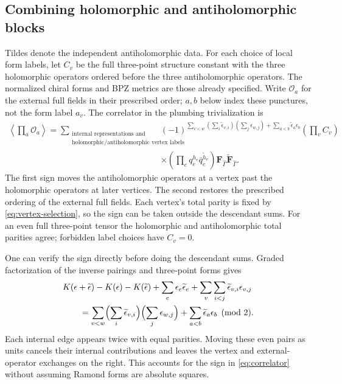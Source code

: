 \documentclass[11pt]{article}
\numberwithin{equation}{section}
\begin{document}
\subsection{Combining holomorphic and antiholomorphic blocks}

Tildes denote the independent antiholomorphic data. For each choice of
local form labels, let $C_v$ be the full three-point structure constant
with the three holomorphic operators ordered before the three
antiholomorphic operators. The normalized chiral forms and BPZ metrics
are those already specified. Write $\mathcal O_a$ for the external full
fields in their prescribed order; $a,b$ below index these punctures,
not the form label $a_v$. The correlator in the plumbing
trivialization is
\begin{align}
 \left\langle\prod_a\mathcal O_a\right\rangle
 =\sum_{\substack{\text{internal representations and}\\
               \text{holomorphic/antiholomorphic vertex labels}}}{}&
 (-1)^{\sum_{v<w}(\sum_i\widetilde\epsilon_{v,i})
                         (\sum_j\epsilon_{w,j})
                +\sum_{a<b}\widetilde\epsilon_a\epsilon_b}
 \left(\prod_v C_v\right)
 \nonumber\\
 &\times\left(\prod_e q_e^{h_e}\bar q_e^{\widetilde h_e}\right)
             \mathbf F_{\hat\Gamma}\widetilde{\mathbf F}_{\hat\Gamma}.
 \label{eq:correlator}
\end{align}
The first sign moves the antiholomorphic operators at a vertex
past the holomorphic operators at later vertices. The second restores
the prescribed ordering of the external full fields. Each vertex's total
parity is fixed by \eqref{eq:vertex-selection}, so the sign can be taken
outside the descendant sums. For an even full three-point tensor the
holomorphic and antiholomorphic total parities agree; forbidden label
choices have $C_v=0$.

One can verify the sign directly before doing the descendant sums.
Graded factorization of the inverse pairings and three-point forms gives
\begin{align}
 &K(\epsilon+\widetilde\epsilon)-K(\epsilon)-K(\widetilde\epsilon)
 +\sum_e\epsilon_e\widetilde\epsilon_e
 +\sum_v\sum_{i<j}\widetilde\epsilon_{v,i}\epsilon_{v,j}
 \nonumber\\
 &\qquad=\sum_{v<w}\Bigl(\sum_i\widetilde\epsilon_{v,i}\Bigr)
                    \Bigl(\sum_j\epsilon_{w,j}\Bigr)
          +\sum_{a<b}\widetilde\epsilon_a\epsilon_b\pmod2.
 \label{eq:correlator-sign}
\end{align}
Each internal edge appears twice with equal parities. Moving these even
pairs as units cancels their internal contributions and leaves the vertex
and external-operator exchanges on the right. This accounts for the sign
in \eqref{eq:correlator} without assuming Ramond forms are absolute squares.
\end{document}
